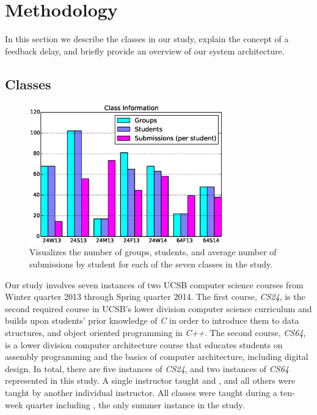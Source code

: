 \section{Methodology} 

In this section we describe the classes in our study, explain the concept of a
feedback delay, and briefly provide an overview of our system architecture.

\subsection{Classes}

\begin{figure}[!t]
\centering \includegraphics[width=3.3in]{graphs/Class_Information.eps}
\caption{Visualizes the number of groups, students, and average number of
  submissions by student for each of the seven classes in the study.}
\end{figure}

Our study involves seven instances of two UCSB computer science courses from
Winter quarter 2013 through Spring quarter 2014. The first course, \emph{CS24},
is the second required course in UCSB's lower division computer science
curriculum and builds upon students' prior knowledge of \emph{C} in order to
introduce them to data structures, and object oriented programming in
\emph{C++}. The second course, \emph{CS64}, is a lower division computer
architecture course that educates students on assembly programming and the
basics of computer architecture, including digital design. In total, there are
five instances of \emph{CS24}, and two instances of \emph{CS64} represented in
this study. A single instructor taught  and , and all
others were taught by another individual instructor. All classes were taught
during a ten-week quarter including , the only summer instance in
the study.

